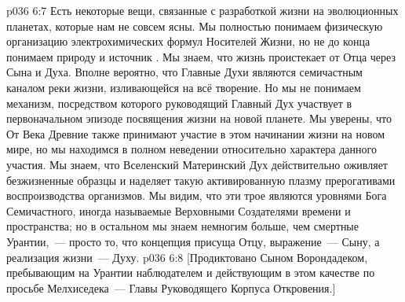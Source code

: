 \vs p036 6:7 \pc Есть некоторые вещи, связанные с разработкой жизни на эволюционных планетах, которые нам не совсем ясны. Мы полностью понимаем физическую организацию электрохимических формул Носителей Жизни, но не до конца понимаем природу и источник . Мы знаем, что жизнь проистекает от Отца через Сына и  Духа. Вполне вероятно, что Главные Духи являются семичастным каналом реки жизни, изливающейся на всё творение. Но мы не понимаем механизм, посредством которого руководящий Главный Дух участвует в первоначальном эпизоде посвящения жизни на новой планете. Мы уверены, что От Века Древние также принимают участие в этом начинании жизни на новом мире, но мы находимся в полном неведении относительно характера данного участия. Мы знаем, что Вселенский Материнский Дух действительно оживляет безжизненные образцы и наделяет такую активированную плазму прерогативами воспроизводства организмов. Мы видим, что эти трое являются уровнями Бога Семичастного, иногда называемые Верховными Создателями времени и пространства; но в остальном мы знаем немногим больше, чем смертные Урантии,~--- просто то, что концепция присуща Отцу, выражение~--- Сыну, а реализация жизни~--- Духу.
\vsetoff
\vs p036 6:8 [Продиктовано Сыном Ворондадеком, пребывающим на Урантии наблюдателем и действующим в этом качестве по просьбе Мелхиседека~--- Главы Руководящего Корпуса Откровения.]
\quizlink
